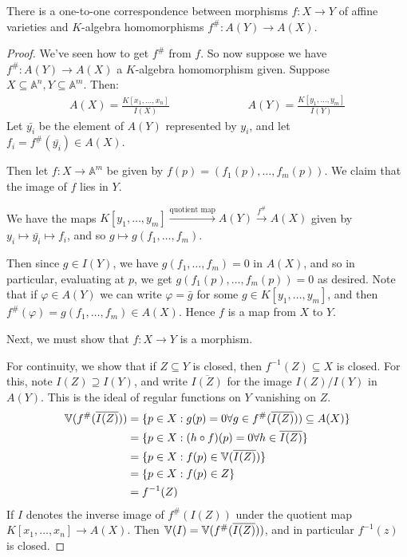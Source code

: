 \documentclass[10pt,a4paper,rgb]{article}
\begin{document}
\begin{theorem}
There is a one-to-one correspondence between morphisms $f:X \to Y$ of affine varieties and $K$-algebra homomorphisms $f^{\#}:A(Y)\to A(X)$.
\end{theorem}
\begin{proof}
We've seen how to get $f^{\#}$ from $f$. So now suppose we have $f^{\#}:A(Y) \to A(X)$ a $K$-algebra homomorphism given. Suppose $X \subseteq \mathbb{A}^n, Y \subseteq \mathbb{A}^m$. Then:
\begin{align*}
A(X) = \frac{K[x_1, \ldots, x_n]}{I(X)}\hspace{7em}A(Y) = \frac{K[y_1, \ldots, y_m]}{I(Y)}
\end{align*}
Let $\bar{y_i}$ be the element of $A(Y)$ represented by $y_i$, and let $f_i = f^{\#}(\bar{y_i}) \in A(X)$.

Then let $f: X \to \mathbb{A}^m$ be given by $f(p) = (f_1(p),\ldots, f_m(p))$. We claim that the image of $f$ lies in $Y$.

We have the maps $K[y_1, \ldots, y_m] \xrightarrow{\text{quotient map}} A(Y) \xrightarrow{f^{\#}} A(X)$ given by $y_i \mapsto \bar{y_i} \mapsto f_i$, and so $g \mapsto g(f_1, \ldots, f_m)$.

Then since $g \in I(Y)$, we have $g(f_1, \ldots, f_m) = 0$ in $A(X)$, and so in particular, evaluating at $p$, we get $g(f_1(p), \ldots, f_m(p)) = 0$ as desired. Note that if $\varphi \in A(Y)$ we can write $\varphi = \bar{g}$ for some $g \in K[y_1, \ldots, y_m]$, and then $f^{\#}(\varphi) = g(f_1, \ldots, f_m) \in A(X)$. Hence $f$ is a map from $X$ to $Y$.

Next, we must show that $f:X \to Y$ is a morphism.

For continuity, we show that if $Z \subseteq Y$ is closed, then $f^{-1}(Z) \subseteq X$ is closed. For this, note $I(Z) \supseteq I(Y)$, and write $\overline{I(Z)}$ for the image $I(Z)/I(Y)$ in $A(Y)$. This is the ideal of regular functions on $Y$ vanishing on $Z$.
\begin{align*}
\mathbb{V}(f^{\#}(\overline{I(Z)})) &= \{p \in X : g(p) = 0 \forall g \in f^{\#}(\overline{I(Z)})) \subseteq A(X)\}\\
&= \{p \in X : (h\circ f)(p) = 0 \forall h \in \overline{I(Z)}\}\\
&= \{p \in X : f(p) \in \mathbb{V}(\overline{I(Z)})\}\\
&= \{p \in X : f(p) \in Z \}\\
&= f^{-1}(Z)
\end{align*}
If $I$ denotes the inverse image of $f^{\#}(I(Z))$ under the quotient map $K[x_1, \ldots, x_n] \to A(X)$. Then $\mathbb{V}(I) = \mathbb{V}(f^{\#}(\overline{I(Z)}))$, and in particular $f^{-1}(z)$ is closed.


\end{proof}
\end{document}
